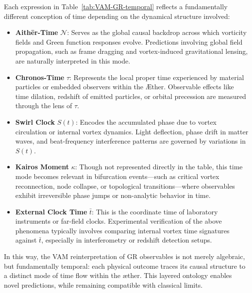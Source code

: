 Each expression in Table~\ref{tab:VAM-GR-temporal} reflects a fundamentally different conception of time depending on the dynamical structure involved:

\begin{itemize}
    \item \textbf{Aithēr-Time} \( \mathcal{N} \): Serves as the global causal backdrop across which vorticity fields and Green function responses evolve. Predictions involving global field propagation, such as frame dragging and vortex-induced gravitational lensing, are naturally interpreted in this mode.

    \item \textbf{Chronos-Time} \( \tau \): Represents the local proper time experienced by material particles or embedded observers within the Æther. Observable effects like time dilation, redshift of emitted particles, or orbital precession are measured through the lens of \( \tau \).

    \item \textbf{Swirl Clock} \( S(t) \): Encodes the accumulated phase due to vortex circulation or internal vortex dynamics. Light deflection, phase drift in matter waves, and beat-frequency interference patterns are governed by variations in \( S(t) \).

    \item \textbf{Kairos Moment} \( \kappa \): Though not represented directly in the table, this time mode becomes relevant in bifurcation events—such as critical vortex reconnection, node collapse, or topological transitions—where observables exhibit irreversible phase jumps or non-analytic behavior in time.

    \item \textbf{External Clock Time} \( \bar{t} \): This is the coordinate time of laboratory instruments or far-field clocks. Experimental verification of the above phenomena typically involves comparing internal vortex time signatures against \( \bar{t} \), especially in interferometry or redshift detection setups.
\end{itemize}

\noindent
In this way, the VAM reinterpretation of GR observables is not merely algebraic, but fundamentally temporal: each physical outcome traces its causal structure to a distinct mode of time flow within the \ae ther. This layered ontology enables novel predictions, while remaining compatible with classical limits.
